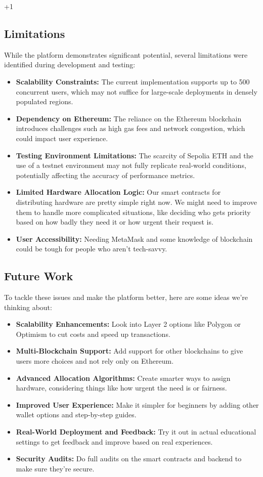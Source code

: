 +1\documentclass[conference]{IEEEtran}
\begin{document}
\subsection{Limitations}
While the platform demonstrates significant potential, several limitations were identified during development and testing:
\begin{itemize}
    \item \textbf{Scalability Constraints:} The current implementation supports up to 500 concurrent users, which may not suffice for large-scale deployments in densely populated regions.
    \item \textbf{Dependency on Ethereum:} The reliance on the Ethereum blockchain introduces challenges such as high gas fees and network congestion, which could impact user experience.
    \item \textbf{Testing Environment Limitations:} The scarcity of Sepolia ETH and the use of a testnet environment may not fully replicate real-world conditions, potentially affecting the accuracy of performance metrics.
    \item \textbf{Limited Hardware Allocation Logic:} Our smart contracts for distributing hardware are pretty simple right now. We might need to improve them to handle more complicated situations, like deciding who gets priority based on how badly they need it or how urgent their request is.
    \item \textbf{User Accessibility:} Needing MetaMask and some knowledge of blockchain could be tough for people who aren't tech-savvy.
\end{itemize}

\subsection{Future Work}
To tackle these issues and make the platform better, here are some ideas we're thinking about:
\begin{itemize}
    \item \textbf{Scalability Enhancements:} Look into Layer 2 options like Polygon or Optimism to cut costs and speed up transactions.
    \item \textbf{Multi-Blockchain Support:} Add support for other blockchains to give users more choices and not rely only on Ethereum.
    \item \textbf{Advanced Allocation Algorithms:} Create smarter ways to assign hardware, considering things like how urgent the need is or fairness.
    \item \textbf{Improved User Experience:} Make it simpler for beginners by adding other wallet options and step-by-step guides.
    \item \textbf{Real-World Deployment and Feedback:} Try it out in actual educational settings to get feedback and improve based on real experiences.
    \item \textbf{Security Audits:} Do full audits on the smart contracts and backend to make sure they're secure.
\end{itemize}
\end{document}
